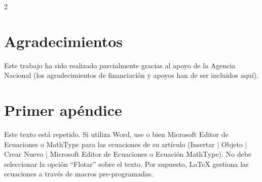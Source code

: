 \documentclass[5p,times,authoryear]{sciarticle}
\begin{document}
\begin{multicols}{2}

\section*{Agradecimientos}

Este trabajo ha sido realizado parcialmente gracias al apoyo de la Agencia Nacional (los agradecimientos de financiación y apoyos han de ser incluidos aquí).

\label{}















\appendix
\section{Primer apéndice}    %
Este texto está repetido. Si utiliza Word, use o bien Microsoft Editor de Ecuaciones o
MathType  para las ecuaciones de su artículo (Insertar | Objeto |
Crear Nuevo | Microsoft Editor de Ecuaciones o Ecuación MathType).
No debe seleccionar la opción ``Flotar'' sobre el texto. Por
supuesto, LaTeX gestiona las ecuaciones a través de macros
pre-programadas.


\end{multicols}
\end{document}
